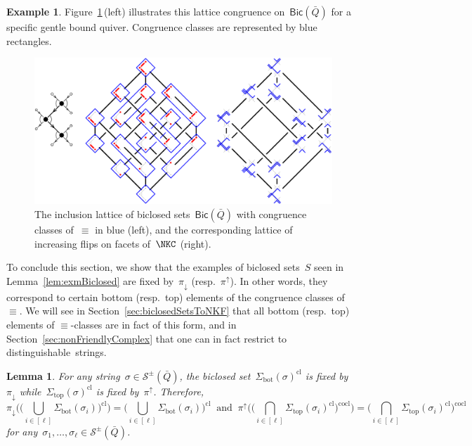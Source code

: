 \documentclass{amsart}
\newtheorem{lemma}[theorem]{Lemma}
\theoremstyle{definition}
\newtheorem{example}[theorem]{Example}
\newcommand{\fref}[1]{Figure~\ref{#1}} %
\newcommand{\strings}{\mathcal{S}} %
\renewcommand{\top}{\mathrm{top}} %
\newcommand{\bottom}{\mathrm{bot}} %
\newcommand{\closure}[1]{#1^{\mathrm{cl}}} %
\newcommand{\coclosure}[1]{#1^{\mathrm{cocl}}} %
\newcommand{\Bicl}[1]{\mathsf{Bic}(#1)} %
\newcommand{\projDown}{\pi_\downarrow} %
\newcommand{\projUp}{\pi^\uparrow} %
\begin{document}
\begin{example}
\fref{fig:exmLatticeQuotient}\,(left) illustrates this lattice congruence on~$\Bicl{\bar Q}$ for a specific gentle bound quiver.
Congruence classes are represented by blue rectangles.

\begin{figure}[t]
	\capstart
	\centerline{\includegraphics[width=1.1\textwidth]{exmLatticeQuotient}}
	\caption{The inclusion lattice of biclosed sets~$\Bicl{\bar Q}$ with congruence classes of~$\equiv$ in blue (left), and the corresponding lattice of increasing flips on facets of~$\NKC$ (right).}
	\label{fig:exmLatticeQuotient}
\end{figure}
\end{example}

To conclude this section, we show that the examples of biclosed sets~$S$ seen in Lemma~\ref{lem:exmBiclosed} are fixed by~$\projDown$ (resp.~$\projUp$).
In other words, they correspond to certain bottom (resp.~top) elements of the congruence classes of~$\equiv$.
We will see in Section~\ref{sec:biclosedSetsToNKF} that all bottom (resp.~top) elements of $\equiv$-classes are in fact of this form, and in Section~\ref{sec:nonFriendlyComplex} that one can in fact restrict to distinguishable~strings.

\begin{lemma}
\label{lem:fixProjDown}
For any string~$\sigma \in \strings^\pm(\bar Q)$, the biclosed set~$\closure{\Sigma_\bottom(\sigma)}$ is fixed by~$\projDown$ while~$\closure{\Sigma_\top(\sigma)}$ is fixed by~$\projUp$.
Therefore,
\[
\projDown \bigg( \closure{\Big( \bigcup_{i \in [\ell]} \Sigma_\bottom(\sigma_i) \Big)} \bigg) = \closure{\Big( \bigcup_{i \in [\ell]} \Sigma_\bottom(\sigma_i) \Big)}
\;\;\text{and}\;\;
\projUp \bigg( \coclosure{\Big( \bigcap_{i \in [\ell]} \closure{\Sigma_\top(\sigma_i)} \Big)} \bigg) = \coclosure{\Big( \bigcap_{i \in [\ell]} \closure{\Sigma_\top(\sigma_i)} \Big)}
\]
for any~$\sigma_1, \dots, \sigma_\ell \in \strings^\pm(\bar Q)$.
\end{lemma}
\end{document}
